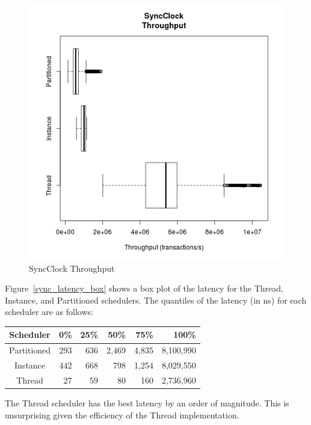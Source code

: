 \begin{figure}
\center
\includegraphics[height=.4\textheight]{sync_throughput_box.png}
\caption{SyncClock Throughput}
\label{sync_throughput_box}
\end{figure}

Figure~\ref{sync_latency_box} shows a box plot of the latency for the Thread, Instance, and Partitioned schedulers.
The quantiles of the latency (in ns) for each scheduler are as follows:
\begin{center}
\begin{tabular}{crrrrr}
Scheduler &       0\%  &    25\%  &    50\%  &    75\%  &   100\% \\
\hline
Partitioned & 293 &   636 & 2,469 & 4,835 &  8,100,990 \\
Instance    & 442 &   668 &   798 & 1,254 &  8,029,550 \\
Thread      &  27 &    59 &    80 &   160 &  2,736,960 \\
\end{tabular}
\end{center}
The Thread scheduler has the best latency by an order of magnitude.
This is unsurprising given the efficiency of the Thread implementation.

